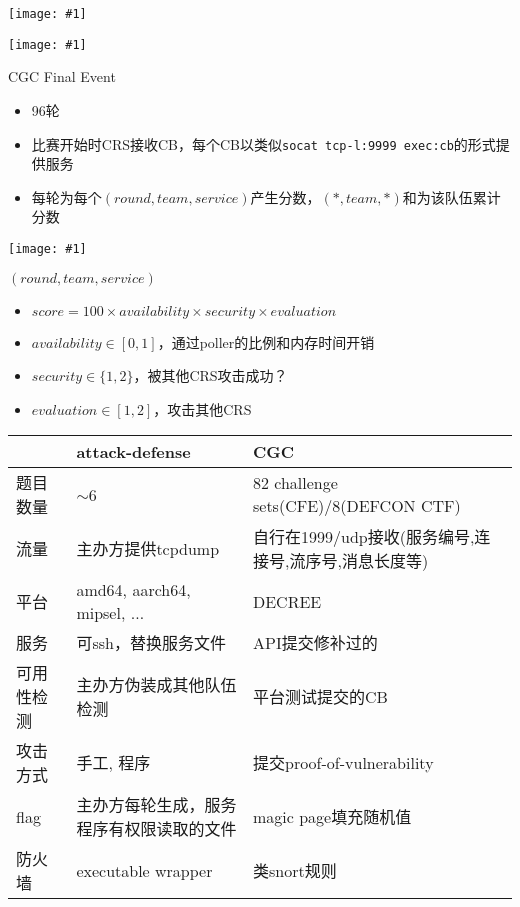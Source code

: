 \documentclass{beamer}
\newcommand{\image}[1]{
  \begin{frame}
    \texttt{[image: \#1]}
  \end{frame}
}
\begin{document}
\image{img/shellphish.jpg}

\image{img/cgc-cfe.jpg}

\begin{frame}
  \begin{block}{CGC Final Event}
    \begin{itemize}
      \item 96轮
      \item 比赛开始时CRS接收CB，每个CB以类似\texttt{socat tcp-l:9999 exec:cb}的形式提供服务
      \item 每轮为每个$(round,team,service)$产生分数，$(*,team,*)$和为该队伍累计分数
    \end{itemize}
  \end{block}
\end{frame}

\image{img/cgc-rack.png}

\begin{frame}
  \begin{block}{$(round,team,service)$}
    \begin{itemize}
      \item $score = 100\times availability\times security\times evaluation$
      \item $availability \in [0,1]$，通过poller的比例和内存时间开销
      \item $security \in \{1,2\}$，被其他CRS攻击成功？
      \item $evaluation \in [1,2]$，攻击其他CRS
    \end{itemize}
  \end{block}
\end{frame}

\begin{frame}
  \small
  \begin{table}
    \begin{tabularx}{\textwidth}{|l|X|X|}
      \hline
      & attack-defense & CGC \\\hline
      题目数量 & $\sim$6 & 82 challenge sets(CFE)/8(DEFCON CTF) \\\hline
      流量 & 主办方提供tcpdump & 自行在1999/udp接收(服务编号,连接号,流序号,消息长度等) \\\hline
      平台 & amd64, aarch64, mipsel, $\ldots$ & DECREE \\\hline
      服务 & 可ssh，替换服务文件 & API提交修补过的 \\\hline
      可用性检测 & 主办方伪装成其他队伍检测 & 平台测试提交的CB \\\hline
      攻击方式 & 手工, 程序 & 提交proof-of-vulnerability \\\hline
      flag & 主办方每轮生成，服务程序有权限读取的文件 & magic page填充随机值 \\
      防火墙 & executable wrapper & 类snort规则 \\\hline
    \end{tabularx}
  \end{table}
\end{frame}
\end{document}
